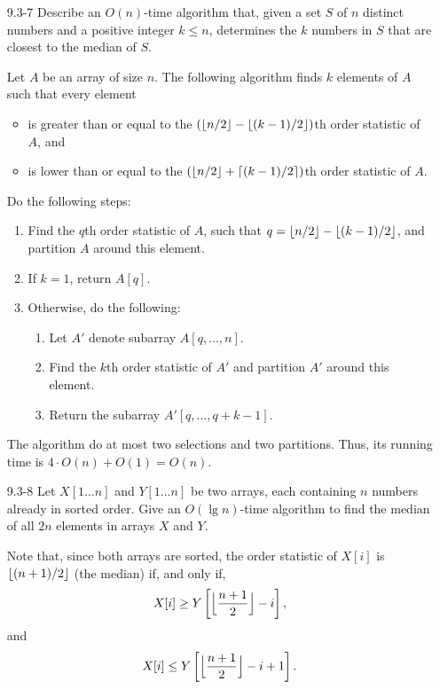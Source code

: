 \begin{enumerate}
\begin{framed}
\end{framed}

\newpage

\item[9.3-7]{Describe an $O(n)$-time algorithm that, given a set $S$ of $n$
distinct numbers and a positive integer $k \le n$, determines the $k$ numbers in
$S$ that are closest to the median of $S$.}

\begin{framed}
Let $A$ be an array of size $n$. The following algorithm finds $k$ elements of
$A$ such that every element
\begin{itemize}
\item is greater than or equal to the $(\lfloor n/2\rfloor - \lfloor(k - 1)/2\rfloor)$th
  order statistic of $A$, and
\item is lower than or equal to the $(\lfloor n/2\rfloor + \lceil(k - 1)/2\rceil)$th order
  statistic of $A$.
\end{itemize}

Do the following steps:
\begin{enumerate}
\item Find the $q$th order statistic of $A$, such that
$q = \lfloor n/2\rfloor - \lfloor(k - 1)/2\rfloor$, and partition $A$ around this element.
\item If $k = 1$, return $A[q]$.
\item Otherwise, do the following:
\begin{enumerate}
\item Let $A'$ denote subarray $A[q, \dots, n]$.
\item Find the $k$th order statistic of $A'$ and partition $A'$ around this
element.
\item Return the subarray $A'[q, \dots, q + k - 1]$.
\end{enumerate}
\end{enumerate}

The algorithm do at most two selections and two partitions. Thus, its running
time is $4 \cdot O(n) + O(1) = O(n)$.
\end{framed}

\item[9.3-8]{Let $X[1 \dots n]$ and $Y[1 \dots n]$ be two arrays, each
containing $n$ numbers already in sorted order. Give an $O(\lg n)$-time algorithm
to find the median of all $2n$ elements in arrays $X$ and $Y$.}

\begin{framed}
Note that, since both arrays are sorted, the order statistic of $X[i]$ is
$\lfloor(n + 1)/2\rfloor$ (the median) if, and only if,
\[
  X[i] \ge Y\left[ \Bigl\lfloor \frac{n + 1}{2} \Bigr\rfloor - i \right],
\]
and
\[
  X[i] \le Y\left[ \Bigl\lfloor \frac{n + 1}{2} \Bigr\rfloor - i + 1 \right].
\]


\end{framed}
\end{enumerate}

